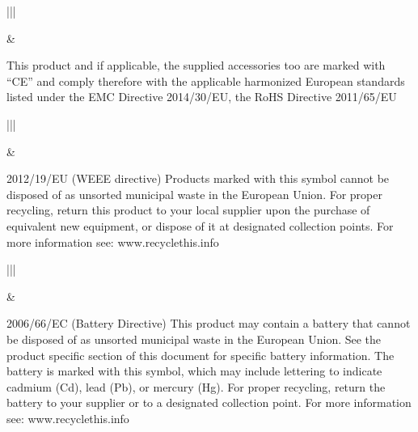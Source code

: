 \documentclass[letterpaper,10pt,english]{sphinxmanual}
\begin{document}


\begin{savenotes}\sphinxattablestart
\centering
\begin{tabular}[t]{|||}
\hline

\noindent{}
&
\\
\hline
\end{tabular}
\par
\sphinxattableend\end{savenotes}

This product and if applicable, the supplied accessories too are marked with “CE” and comply therefore with the applicable harmonized European standards listed under the EMC Directive 2014/30/EU, the RoHS Directive 2011/65/EU


\begin{savenotes}\sphinxattablestart
\centering
\begin{tabular}[t]{|||}
\hline

\noindent{}
&
\\
\hline
\end{tabular}
\par
\sphinxattableend\end{savenotes}

2012/19/EU (WEEE directive) Products marked with this symbol cannot be disposed of as unsorted municipal waste in the European Union. For proper recycling, return this product to your local supplier upon the purchase of equivalent new equipment, or dispose of it at designated collection points. For more information see: www.recyclethis.info


\begin{savenotes}\sphinxattablestart
\centering
\begin{tabular}[t]{|||}
\hline

\noindent{}
&
\\
\hline
\end{tabular}
\par
\sphinxattableend\end{savenotes}

2006/66/EC (Battery Directive) This product may contain a battery that cannot be disposed of as unsorted municipal waste in the European Union. See the product specific section of this document for specific battery information. The battery is marked with this symbol, which may include lettering to indicate cadmium (Cd), lead (Pb), or mercury (Hg). For proper recycling, return the battery to your supplier or to a designated collection point. For more information see: www.recyclethis.info
\end{document}
